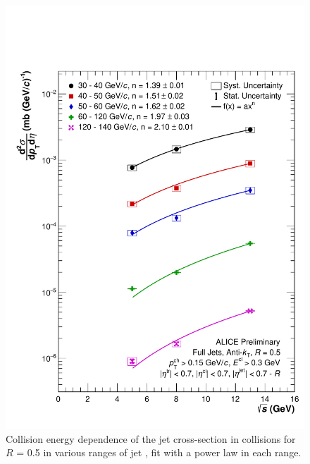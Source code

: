 \begin{figure}[h!]
    \centering
    \includegraphics[width=15cm]{figures/EnergyComparisons/sqrtSComp_R05.pdf}
    \caption{Collision energy dependence of the jet cross-section in \pp collisions for $R$ = 0.5 in various ranges of jet \pT, fit with a power law in each \pT range.}
    \label{fig:appSqrtSCompareR05}
\end{figure}


